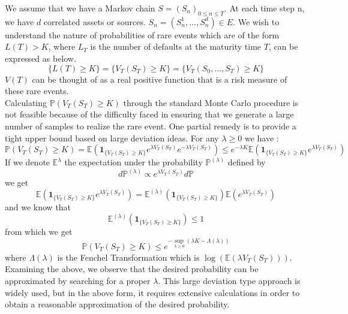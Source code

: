 We assume that we have a Markov chain $S=(S_n)_{0 \leq n \leq T}$. At each time step n, we have $d$ correlated assets or sources. $S_n = (S_n^1,...,S_n^d) \in \mathit{E}$. We wish to understand the nature of probabilities of rare events which are of the form $L(T) > K$, where $L_T$ is the number of defaults at the maturity time $T$, can be expressed as below.
$$
\{L(T) \geq K\} = \{V_T(S_T)\geq K\} = \{V_T(S_0,...,S_T)\geq K\}
$$
$V(T)$ can be thought of as a real positive function that is a risk measure of these rare events.\\
Calculating $\mathbb{P}(V_T(S_T) \geq K)$ through the standard Monte Carlo procedure is not feasible because of the difficulty faced in ensuring that we generate a large number of samples to realize the rare event. One partial remedy is to provide a tight upper bound based on large deviation ideas. For any $\lambda \geq 0$ we have :
\begin{equation}
	\mathbb{P}(V_T(S_T)\geq K) = \mathbb{E}\left( \mathbf{1}_{\{V_T(S_T)\geq K\}} e^{\lambda V_T(S_T)} e^{-\lambda V_T(S_T)} \right) \leq
	e^{-\lambda K}\mathbb{E}\left( \mathbf{1}_{\{V_T(S_T)\geq K\}}e^{\lambda V_T(S_T)} \right)
\end{equation}
If we denote $\mathbb{E^{\lambda}}$ the expectation under the probability $\mathbb{P}^{(\lambda)}$ defined by
$$d\mathbb{P}^{(\lambda)} \propto e^{\lambda V_T(S_T)}d\mathbb{P}$$
we get 
$$\mathbb{E}\left( \mathbf{1}_{\{V_T(S_T)\geq K\}}e^{\lambda V_T(S_T)}  \right) = \mathbb{E}^{(\lambda)}\left(\mathbf{1}_{\{V_T(S_T)\geq K\}}\right)\mathbb{E}\left(e^{\lambda V_T(S_T)}\right)$$
and we know that
$$\mathbb{E}^{(\lambda)}\left(\mathbf{1}_{\{V_T(S_T)\geq K\}}\right)\leq 1 $$
from which we get
\begin{equation}
	\mathbb{P}\left(V_T(S_T) \geq K\right) \leq e^{-\sup_{\lambda\geq 0}(\lambda K - \Lambda(\lambda))}
\end{equation}
where $\Lambda(\lambda)$ is the Fenchel Transformation which is $\log (\mathbb{E}(\lambda V_T(S_T)))$.\\
Examining the above, we observe that the desired probability can be approximated by searching for a proper $\lambda$. This large deviation type approach is widely used, but in the above form, it requires extensive calculations in order to obtain a reasonable approximation of the desired probability.\\

